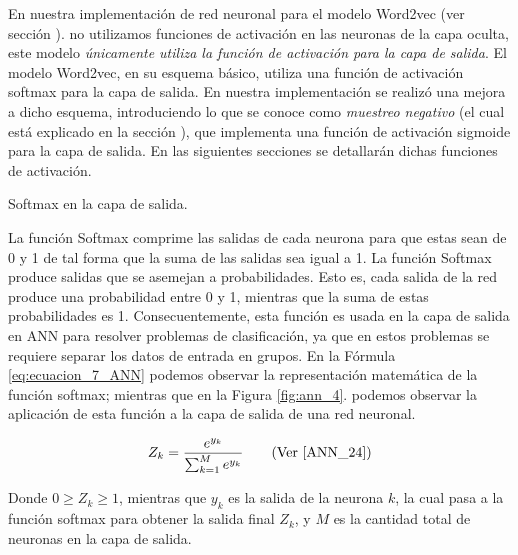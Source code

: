 \documentclass[12pt,a4paper]{article}
\makeatletter
\renewcommand\paragraph{\@startsection{paragraph}{4}{\z@}
            {-2.5ex\@plus -1ex \@minus -.25ex}
            {1.25ex \@plus .25ex}
            {\normalfont\normalsize\bfseries}}
\makeatother
\begin{document}
\begin{sloppypar}
En nuestra implementación de red neuronal para el modelo Word2vec (ver sección \textit{}). no utilizamos funciones de activación en las neuronas de la capa oculta, este modelo \textit{únicamente utiliza la función de activación para la capa de salida}. 
El modelo Word2vec, en su esquema básico, utiliza una función de activación softmax para la capa de salida. En nuestra implementación se realizó una mejora a dicho esquema, introduciendo lo que se conoce como \textit{muestreo negativo} (el cual está explicado en la sección \textit{}), que implementa una función de activación sigmoide para la capa de salida. En las siguientes secciones se detallarán dichas funciones de activación.

\paragraph{Softmax en la capa de salida.}\label{soft_capa_salida}

La función Softmax comprime las salidas de cada neurona para que estas sean de 0 y 1 de tal forma que la suma de las salidas sea igual a 1. La función Softmax produce salidas que se asemejan a probabilidades. Esto es, cada salida de la red produce una probabilidad entre 0 y 1, mientras que la suma de estas probabilidades es 1. Consecuentemente, esta función es usada en la capa de salida en ANN para resolver problemas de clasificación, ya que en estos problemas se requiere separar los datos de entrada en grupos. 
En la Fórmula \ref{eq:ecuacion_7_ANN} podemos observar la representación matemática de la función softmax; mientras que en la Figura \ref{fig:ann_4}. podemos observar la aplicación de esta función a la capa de salida de una red neuronal.

\begin{equation}\label{eq:ecuacion_7_ANN}
Z_k= \frac{e^{y_k}}{\sum_{k=1}^{M}e^{y_k}} \qquad \text{(Ver \cite{ANN_24})}
\end{equation}

Donde $0 \geq Z_k \geq 1$, mientras que $y_k$ es la salida de la neurona $k$, la cual pasa a la función softmax para obtener la salida final $Z_k$, y $M$ es la cantidad total de neuronas en la capa de salida.     


\end{sloppypar}
\end{document}
